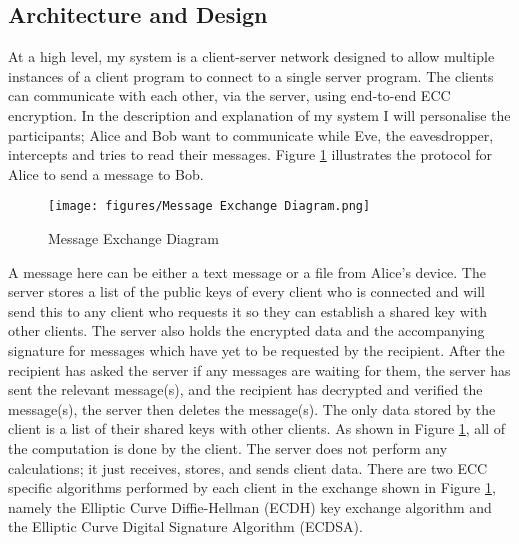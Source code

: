 \documentclass[12pt,a4paper]{article}
\begin{document}
\subsection{Architecture and Design} \noindent \label{Architecture}
At a high level, my system is a client-server network designed to allow 
multiple instances of a client program to connect to a single server program. 
The clients can communicate with each other, via the server, using end-to-end ECC encryption. 
In the description and explanation of my system I will personalise the participants; 
Alice and Bob want to communicate while Eve, the eavesdropper, intercepts and tries to read their messages. 
Figure \ref{fig:messages} illustrates the protocol for Alice to send a message to Bob. 

\begin{figure}[!htb]
    \centering
    \texttt{[image: figures/Message Exchange Diagram.png]}
    \caption{Message Exchange Diagram}
    \label{fig:messages}
\end{figure}

A message here can be either a text message or a file from Alice's device. 
The server stores a list of the public keys of every client who is connected 
and will send this to any client who requests it so they can establish a shared key with other clients. 
The server also holds the encrypted data and the accompanying signature for messages which have yet to be requested by the recipient. 
After the recipient has asked the server if any messages are waiting for them, the server has sent the relevant message(s), 
and the recipient has decrypted and verified the message(s), the server then deletes the message(s). 
The only data stored by the client is a list of their shared keys with other clients. 
As shown in Figure \ref{fig:messages}, all of the computation is done by the client. 
The server does not perform any calculations; it just receives, stores, and sends client data. 
There are two ECC specific algorithms performed by each client in the exchange shown in Figure \ref{fig:messages}, 
namely the Elliptic Curve Diffie-Hellman (ECDH) key exchange algorithm and the Elliptic Curve Digital Signature Algorithm (ECDSA). 
\end{document}
